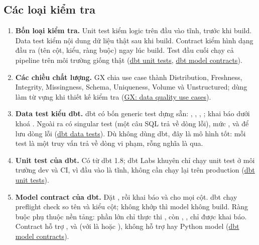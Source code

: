 \subsection{Các loại kiểm tra}
\begin{enumerate}
  \item \textbf{Bốn loại kiểm tra.} Unit test kiểm logic trên đầu vào tĩnh, trước khi build. Data test kiểm nội dung dữ liệu thật sau khi build. Contract kiểm hình dạng đầu ra (tên cột, kiểu, ràng buộc) ngay lúc build. Test đầu cuối chạy cả pipeline trên môi trường giống thật (\href{https://docs.getdbt.com/docs/build/unit-tests}{dbt unit tests}, \href{https://docs.getdbt.com/docs/mesh/govern/model-contracts}{dbt model contracts}).
  \item \textbf{Các chiều chất lượng.} GX chia use case thành Distribution, Freshness, Integrity, Missingness, Schema, Uniqueness, Volume và Unstructured; dùng làm từ vựng khi thiết kế kiểm tra (\href{https://docs.greatexpectations.io/docs/reference/learn/data_quality_use_cases/dq_use_cases_lp/}{GX: data quality use cases}).
  \item \textbf{Data test kiểu dbt.} dbt có bốn generic test dựng sẵn: , , , ; khai báo dưới khoá . Ngoài ra có singular test (một câu SQL trả về dòng lỗi), mức , và  để lưu dòng lỗi (\href{https://docs.getdbt.com/docs/build/data-tests}{dbt data tests}). Dù không dùng dbt, đây là mô hình tốt: mỗi test là một truy vấn trả về dòng vi phạm, rỗng nghĩa là qua.
  \item \textbf{Unit test của dbt.} Có từ dbt 1.8; dbt Labs khuyên chỉ chạy unit test ở môi trường dev và CI, vì đầu vào là tĩnh, không cần chạy lại trên production (\href{https://docs.getdbt.com/docs/build/unit-tests}{dbt unit tests}).
  \item \textbf{Model contract của dbt.} Đặt , rồi khai báo  và  cho mọi cột. dbt chạy preflight check so tên và kiểu cột; không khớp thì model không build. Ràng buộc phụ thuộc nền tảng: phần lớn chỉ thực thi , còn , ,  chỉ được khai báo. Contract hỗ trợ ,  và  (với  là  hoặc ), không hỗ trợ  hay Python model (\href{https://docs.getdbt.com/docs/mesh/govern/model-contracts}{dbt model contracts}).
\end{enumerate}

